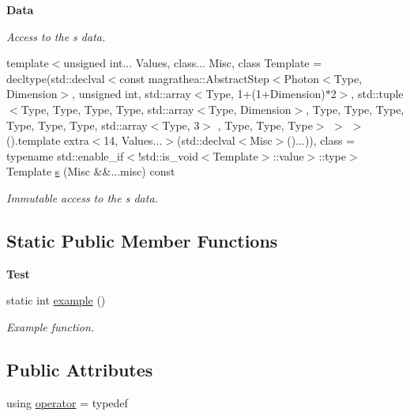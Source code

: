 \begin{Indent}{\bf Data}
\begin{DoxyCompactItemize}
\begin{DoxyCompactList}\small\item\em Access to the s data. \end{DoxyCompactList}\item 
{\footnotesize template$<$unsigned int... Values, class... Misc, class Template  = decltype(std\-::declval$<$const magrathea\-::\-Abstract\-Step$<$\-Photon$<$\-Type, Dimension$>$, unsigned int, std\-::array$<$\-Type, 1+(1+\-Dimension)$\ast$2$>$, std\-::tuple$<$\-Type, Type, Type, Type, std\-::array$<$\-Type, Dimension$>$, Type, Type, Type, Type, Type, Type, std\-::array$<$\-Type, 3$>$ , Type, Type, Type$>$ $>$ $>$().\-template extra$<$14, Values...$>$(std\-::declval$<$\-Misc$>$()...)), class  = typename std\-::enable\-\_\-if$<$!std\-::is\-\_\-void$<$\-Template$>$\-::value$>$\-::type$>$ }\\Template \hyperlink{exceptionPhoton_a11aba68f338aa79237096516e2316990}{s} (Misc \&\&...misc) const 
\begin{DoxyCompactList}\small\item\em Immutable access to the s data. \end{DoxyCompactList}\end{DoxyCompactItemize}
\end{Indent}
\subsection*{Static Public Member Functions}
\begin{Indent}{\bf Test}\par
\begin{DoxyCompactItemize}
\item 
static int \hyperlink{exceptionPhoton_a081826aaf17dd43b8c490489f1cfec2d}{example} ()
\begin{DoxyCompactList}\small\item\em Example function. \end{DoxyCompactList}\end{DoxyCompactItemize}
\end{Indent}
\subsection*{Public Attributes}
\begin{DoxyCompactItemize}
\item 
using \hyperlink{exceptionPhoton_ab2d630b986fb370437db93d91f2454b0}{operator} = typedef
\end{DoxyCompactItemize}
